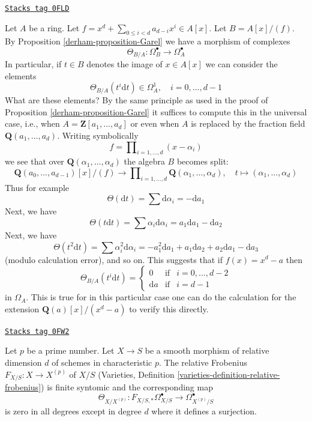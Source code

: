 \begin{example}[Garel]
\label{derham-example-Garel}
\href{https://stacks.math.columbia.edu/tag/0FLD}{\texttt{Stacks tag 0FLD}}

Let $A$ be a ring. Let $f = x^d + \sum_{0 \leq i < d} a_{d - i} x^i \in A[x]$.
Let $B = A[x]/(f)$. By Proposition \ref{derham-proposition-Garel}
we have a morphism of complexes
$$
\Theta_{B/A} : \Omega^\bullet_B \longrightarrow \Omega^\bullet_A
$$
In particular, if $t \in B$ denotes the image of $x \in A[x]$
we can consider the elements
$$
\Theta_{B/A}(t^i\text{d}t) \in \Omega^1_A,\quad i = 0, \ldots, d - 1
$$
What are these elements? By the same principle as used in the proof of
Proposition \ref{derham-proposition-Garel} it suffices to compute this
in the universal case, i.e., when $A = \mathbf{Z}[a_1, \ldots, a_d]$
or even when $A$ is replaced by the fraction field
$\mathbf{Q}(a_1, \ldots, a_d)$. Writing symbolically
$$
f = \prod\nolimits_{i = 1, \ldots, d} (x - \alpha_i)
$$
we see that over $\mathbf{Q}(\alpha_1, \ldots, \alpha_d)$
the algebra $B$ becomes split:
$$
\mathbf{Q}(a_0, \ldots, a_{d - 1})[x]/(f)
\longrightarrow
\prod\nolimits_{i = 1, \ldots, d} \mathbf{Q}(\alpha_1, \ldots, \alpha_d),
\quad
t \longmapsto (\alpha_1, \ldots, \alpha_d)
$$
Thus for example
$$
\Theta(\text{d}t) = \sum \text{d} \alpha_i = - \text{d}a_1
$$
Next, we have
$$
\Theta(t\text{d}t) = \sum \alpha_i \text{d}\alpha_i =
a_1 \text{d} a_1 - \text{d}a_2
$$
Next, we have
$$
\Theta(t^2\text{d}t) = \sum \alpha_i^2 \text{d}\alpha_i =
- a_1^2 \text{d} a_1 + a_1 \text{d}a_2 + a_2 \text{d}a_1 - \text{d}a_3
$$
(modulo calculation error), and so on. This suggests that
if $f(x) = x^d - a$ then
$$
\Theta_{B/A}(t^i\text{d}t) =
\left\{
\begin{matrix}
0 & \text{if} & i = 0, \ldots, d - 2 \\
\text{d}a & \text{if} & i = d - 1
\end{matrix}
\right.
$$
in $\Omega_A$. This is true for in this particular case one can do
the calculation for the extension $\mathbf{Q}(a)[x]/(x^d - a)$
to verify this directly.
\end{example}

\begin{lemma}
\label{derham-lemma-Garel-map-frobenius-smooth-char-p}
\href{https://stacks.math.columbia.edu/tag/0FW2}{\texttt{Stacks tag 0FW2}}

Let $p$ be a prime number. Let $X \to S$ be a smooth morphism
of relative dimension $d$ of schemes in characteristic $p$.
The relative Frobenius $F_{X/S} : X \to X^{(p)}$ of $X/S$
(Varieties, Definition \ref{varieties-definition-relative-frobenius})
is finite syntomic and the corresponding map
$$
\Theta_{X/X^{(p)}} :
F_{X/S, *}\Omega^\bullet_{X/S} \to \Omega^\bullet_{X^{(p)}/S}
$$
is zero in all degrees except in degree $d$ where it defines a
surjection.
\end{lemma}

